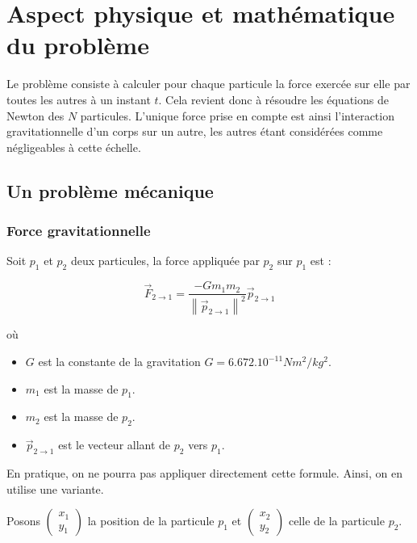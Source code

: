 \chapter{Aspect physique et mathématique du problème}
Le problème consiste à calculer pour chaque particule la force exercée sur elle par toutes les autres à un instant $t$.
Cela revient donc à résoudre les équations de Newton des $N$ particules. L'unique force prise en compte est ainsi l'interaction gravitationnelle d'un corps sur un autre, les autres étant considérées comme négligeables à cette échelle.

\section{Un problème mécanique}
\vspace{2mm}
\subsection{Force gravitationnelle}
\vspace{2mm}

Soit $p_{1}$ et $p_{2}$ deux particules, la force appliquée par $p_2$ sur $p_1$ est :

\begin{equation}
\vec{F}_{2 \rightarrow 1} = \frac{-Gm_1m_2}{{\left\| \vec{p}_{2 \rightarrow 1} \right\|}^2} \vec{p}_{2 \rightarrow 1}
\end{equation}

où 
\begin{itemize}
\item  $G$ est la constante de la gravitation $G = {6.672.10^{-11}}{Nm^2/kg^2}$.

\item $m_1$ est la masse de $p_1$.
\item $m_2$ est la masse de $p_2$.
\item $\vec{p}_{2 \rightarrow 1}$ est le vecteur  allant de $p_2$ vers $p_1$.


\end{itemize}

\vspace{2mm}

En pratique, on ne pourra pas appliquer directement cette formule. Ainsi, on en utilise une variante.

Posons $\begin{pmatrix}
x_1\\
y_1
\end{pmatrix}$ la position de la particule $p_1$ et $\begin{pmatrix}
x_2\\
y_2
\end{pmatrix}$ celle de la particule $p_2$.


